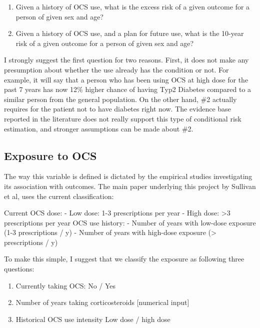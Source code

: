 \documentclass[
]{article}
\begin{document}
\begin{enumerate}
\def\labelenumi{\arabic{enumi}.}
\item
  Given a history of OCS use, what is the excess risk of a given outcome
  for a person of given sex and age?
\item
  Given a history of OCS use, and a plan for future use, what is the
  10-year risk of a given outcome for a person of given sex and age?
\end{enumerate}

I strongly suggest the first question for two reasons. First, it does
not make any presumption about whether the use already has the condition
or not. For example, it will say that a person who has been using OCS at
high dose for the past 7 years has now 12\% higher chance of having Typ2
Diabetes compared to a similar person from the general population. On
the other hand, \#2 actually requires for the patient not to have
diabetes right now. The evidence base reported in the literature does
not really support this type of conditional risk estimation, and
stronger assumptions can be made about \#2.

\hypertarget{exposure-to-ocs}{%
\subsection{Exposure to OCS}\label{exposure-to-ocs}}

The way this variable is defined is dictated by the empirical studies
investigating its association with outcomes. The main paper underlying
this project by Sullivan et al, uses the current classification:

Current OCS dose: - Low dose: 1-3 prescriptions per year - High dose:
\textgreater3 prescriptions per year OCS use history: - Number of years
with low-dose exposure (1-3 prescriptions / y) - Number of years with
high-dose exposure (\textgreater{} prescriptions / y)

To make this simple, I suggest that we classify the exposure as
following three questions:

\begin{enumerate}
\def\labelenumi{\arabic{enumi})}
\item
  Currently taking OCS: No / Yes
\item
  Number of years taking corticosteroids {[}numerical input{]}
\item
  Historical OCS use intensity Low dose / high dose
\end{enumerate}
\end{document}
